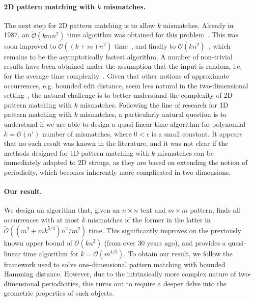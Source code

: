 \documentclass[twoside,leqno]{article}
\renewcommand{\O}{\mathcal{O}}
\newcommand{\tO}{\tilde{\mathcal{O}}}
\begin{document}
\paragraph{2D pattern matching with \boldmath$k$\unboldmath{} mismatches.} The next step for 2D pattern matching is to allow $k$ mismatches.
Already in 1987, an $\tO(kmn^{2})$ time algorithm was obtained for this problem~\cite{Krithivasan1987}. This was
soon improved to $\tO((k+m)n^2)$ time~\cite{Ranka1991}, and finally to $\O(kn^2)$~\cite{Amir1991}, which remains
to be the asymptotically fastest algorithm. A number of non-trivial results have been obtained under the assumption
that the input is random, i.e. for the average time complexity~\cite{Baeza-Yates1998,Park1998,Kaerkkaeinen1999}.
Given that other notions of approximate occurrences, e.g. bounded edit distance, seem less natural in the two-dimensional
setting~\cite{Baeza-Yates1998a}, the natural challenge is to better understand the complexity
of 2D pattern matching with $k$ mismatches. Following the line of research for 1D pattern matching with $k$
mismatches, a particularly natural question is to understand if we are able to design a quasi-linear time
algorithm for polynomial $k=\O(n^{\epsilon})$ number of mismatches, where $0 < \epsilon$ is a small constant. It appears that no such result was known
in the literature, and it was not clear if the methods designed for 1D pattern matching with $k$ mismatches
can be immediately adapted to 2D strings, as they are based on extending the notion of periodicity, which becomes
inherently more complicated in two dimensions.

\paragraph{Our result.} We design an algorithm that, given an $n\times n$ text and $m\times m$ pattern, finds
all occurrences with at most $k$ mismatches of the former in the latter in $\tO((m^2 + mk^{5/4})n^2 / m^2)$ time.
This significantly improves on the previously known upper bound of $\O(kn^{2})$ (from over 30 years ago),
and provides a quasi-linear time algorithm for $k=\O(m^{4/5})$. To obtain our result, we follow the framework
used to solve one-dimensional pattern matching with bounded Hamming distance. However, due to the intrinsically
more complex nature of two-dimensional periodicities, this turns out to require a deeper delve into the geometric
properties of such objects.
\end{document}
